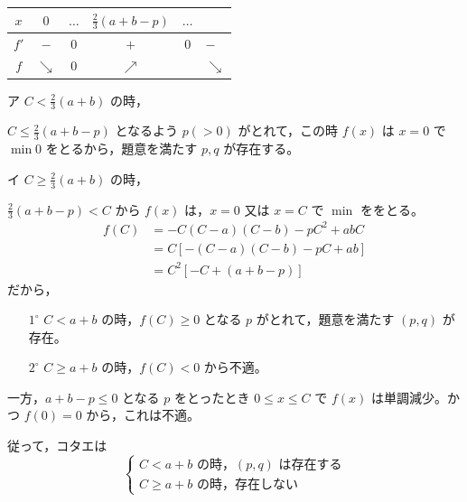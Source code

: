 \documentclass[../main.tex]{subfiles}
\begin{document}
\begin{center}
\end{center}

\begin{center}
  \begin{tabular}{c|c|c|c|c}
    $x$ & $0$ & $\dots$ & $\frac{2}{3}(a+b-p)$ & $\dots$ \\ \hline
    $f'$ & $-$ & $0$ & $+$ & $0$ & $-$ \\ \hline
    $f$ & $\searrow$ & $0$ & $\nearrow$ & & $\searrow$
  \end{tabular}
\end{center}

ア $C < \frac{2}{3}(a+b)$ の時，

$C \le \frac{2}{3}(a+b-p)$ となるよう $p (>0)$ がとれて，この時 $f(x)$ は $x=0$ で $\min 0$ をとるから，題意を満たす $p, q$ が存在する。

イ $C \ge \frac{2}{3}(a+b)$ の時，

$\frac{2}{3}(a+b-p) < C$ から $f(x)$ は，$x=0$ 又は $x=C$ で $\min$ ををとる。
\begin{align*}
  f(C) &= -C(C-a)(C-b) - pC^2 + abC \\
  &= C [ -(C-a)(C-b) - pC + ab ] \\
  &= C^2 [ -C + (a+b-p) ]
\end{align*}
だから，
\begin{enumerate}
  \item[$1^\circ$] $C < a+b$ の時，$f(C) \ge 0$ となる $p$ がとれて，題意を満たす $(p, q)$ が存在。
  \item[$2^\circ$] $C \ge a+b$ の時，$f(C) < 0$ から不適。
\end{enumerate}

一方，$a+b-p \le 0$ となる $p$ をとったとき $0 \le x \le C$ で $f(x)$ は単調減少。かつ $f(0) = 0$ から，これは不適。

従って，コタエは
\[
  \begin{cases}
    C < a+b \text{ の時，} (p, q) \text{ は存在する} \\
    C \ge a+b \text{ の時，存在しない}
  \end{cases}
\]

\newpage
\end{document}
